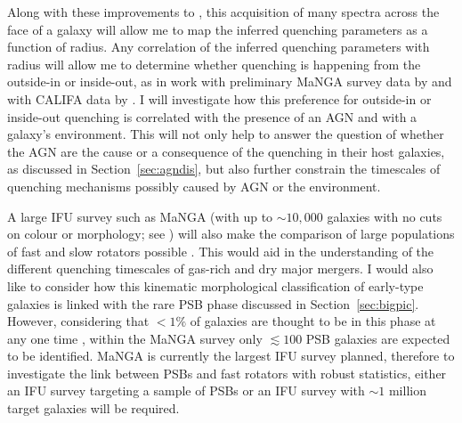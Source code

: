 Along with these improvements to \starpy, this acquisition of many spectra across the face of a galaxy will allow me to map the inferred quenching parameters as a function of radius. Any correlation of the inferred quenching parameters with radius will allow me to determine whether quenching is happening from the outside-in \citep[i.e. quenching due to environmental mechanisms, as in][]{pan15, clarke16, schaefer17} or inside-out, as in work with preliminary MaNGA survey data by \citet{belfiore16} and with CALIFA data by \citet{gonzalez16}. I will investigate how this preference for outside-in or inside-out quenching is correlated with the presence of an AGN and with a galaxy's environment. This will not only help to answer the question of whether the AGN are the cause or a consequence of the quenching in their host galaxies, as discussed in Section~\ref{sec:agndis}, but also further constrain the timescales of quenching mechanisms possibly caused by AGN or the environment. 

A large IFU survey such as MaNGA (with up to $\sim10,000$ galaxies with no cuts on colour or morphology; see \citealt{bundy15}) will also make the comparison of large populations of fast and slow rotators possible \citep[see work with the first results from MaNGA by][]{penny16}. This would aid in the understanding of the different quenching timescales of gas-rich and dry major mergers. I would also like to consider how this kinematic morphological classification of early-type galaxies is linked with the rare PSB phase discussed in Section~\ref{sec:bigpic}. However, considering that $<1\%$ of galaxies are thought to be in this phase at any one time \citep{Wong12, wild16}, within the MaNGA survey only $\lesssim100$ PSB galaxies are expected to be identified. MaNGA is currently the largest IFU survey planned, therefore to investigate the link between PSBs and fast rotators with robust statistics, either an IFU survey targeting a sample of PSBs or an IFU survey with $\sim 1$ million target galaxies will be required. 

